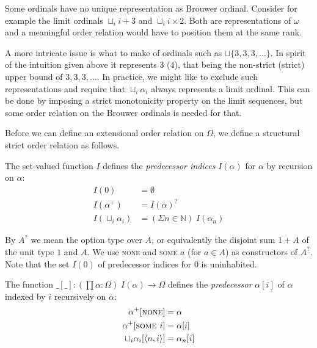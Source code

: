 Some ordinals have no unique representation as Brouwer ordinal. Consider for
example the limit ordinals $\sqcup_i i + 3$ and $\sqcup_i i \times 2$. Both
are representations of $\omega$ and a meaningful order relation would have to
position them at the same rank.

A more intricate issue is what to make of ordinals such as $\sqcup \{ 3, 3, 3,
\ldots \}$. In spirit of the intuition given above it represents $3$ ($4$),
that being the non-strict (strict) upper bound of $3, 3, 3, \ldots$.
In practice, we might like to exclude such representations and require that
$\sqcup_i \alpha_i$ always represents a limit ordinal. This can be done by
imposing a strict monotonicity property on the limit sequences, but some order
relation on the Brouwer ordinals is needed for that.


Before we can define an extensional order relation on $\Omega$, we define a
structural strict order relation as follows.

\begin{definition}%
The set-valued function $I$ defines the \emph{predecessor indices} $I(\alpha)$
for $\alpha$ by recursion on $\alpha$:
\begin{align*}
  I(0)                 &= \emptyset \\
  I(\alpha^+)          &= I(\alpha)^? \\
  I(\sqcup_i \alpha_i) &= (\Sigma n \in \mathbb{N}) \; I(\alpha_n)
\end{align*}
\end{definition}


By $A^?$ we mean the option type over $A$, or equivalently the disjoint sum
$1 + A$ of the unit type $1$ and $A$. We use \textsc{none} and \textsc{some
  $a$} (for $a \in A$) as constructors of $A^?$. Note that the set $I(0)$ of
predecessor indices for $0$ is uninhabited.

\begin{definition}%
The function $\_[\_] : (\prod \alpha : \Omega) \; I(\alpha) \rightarrow
\Omega$ defines the \emph{predecessor} $\alpha[i]$ of $\alpha$ indexed by $i$
recursively on $\alpha$:
\begin{align*}
  \alpha^+[\textsc{none}]                 &= \alpha \\
  \alpha^+[\textsc{some $i$}]             &= \alpha[i] \\
  \sqcup_i \alpha_i[\langle n, i \rangle] &= \alpha_n[i]
\end{align*}
\end{definition}

